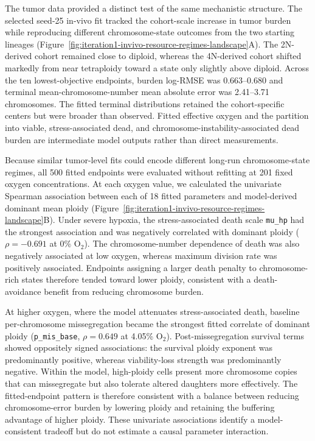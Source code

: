 \documentclass[11pt]{article}
\begin{document}
The tumor data provided a distinct test of the same mechanistic structure. The selected seed-25 in-vivo fit tracked the cohort-scale increase in tumor burden while reproducing different chromosome-state outcomes from the two starting lineages (Figure~\ref{fig:iteration1-invivo-resource-regimes-landscape}A). The 2N-derived cohort remained close to diploid, whereas the 4N-derived cohort shifted markedly from near tetraploidy toward a state only slightly above diploid. Across the ten lowest-objective endpoints, burden log-RMSE was 0.663--0.680 and terminal mean-chromosome-number mean absolute error was 2.41--3.71 chromosomes. The fitted terminal distributions retained the cohort-specific centers but were broader than observed. Fitted effective oxygen and the partition into viable, stress-associated dead, and chromosome-instability-associated dead burden are intermediate model outputs rather than direct measurements.

Because similar tumor-level fits could encode different long-run chromosome-state regimes, all 500 fitted endpoints were evaluated without refitting at 201 fixed oxygen concentrations. At each oxygen value, we calculated the univariate Spearman association between each of 18 fitted parameters and model-derived dominant mean ploidy (Figure~\ref{fig:iteration1-invivo-resource-regimes-landscape}B). Under severe hypoxia, the stress-associated death scale \texttt{mu\_hp} had the strongest association and was negatively correlated with dominant ploidy (\(\rho=-0.691\) at 0\% O$_2$). The chromosome-number dependence of death was also negatively associated at low oxygen, whereas maximum division rate was positively associated. Endpoints assigning a larger death penalty to chromosome-rich states therefore tended toward lower ploidy, consistent with a death-avoidance benefit from reducing chromosome burden.

At higher oxygen, where the model attenuates stress-associated death, baseline per-chromosome missegregation became the strongest fitted correlate of dominant ploidy (\texttt{p\_mis\_base}, \(\rho=0.649\) at 4.05\% O$_2$). Post-missegregation survival terms showed oppositely signed associations: the survival ploidy exponent was predominantly positive, whereas viability-loss strength was predominantly negative. Within the model, high-ploidy cells present more chromosome copies that can missegregate but also tolerate altered daughters more effectively. The fitted-endpoint pattern is therefore consistent with a balance between reducing chromosome-error burden by lowering ploidy and retaining the buffering advantage of higher ploidy. These univariate associations identify a model-consistent tradeoff but do not estimate a causal parameter interaction.
\end{document}

